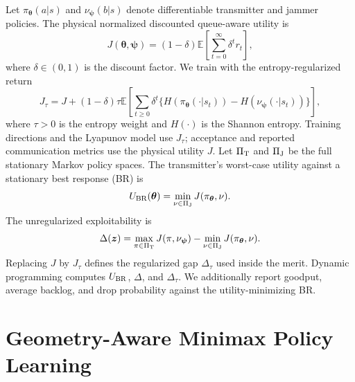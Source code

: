\documentclass[conference]{IEEEtran}
\newcommand{\bz}{\bm{z}}
\newcommand{\btheta}{\bm{\theta}}
\newcommand{\bpsi}{\bm{\psi}}
\newcommand{\E}{\mathbb{E}}
\begin{document}
Let $\pi_{\btheta}(a|s)$ and $\nu_{\bpsi}(b|s)$ denote differentiable transmitter and jammer policies.
The physical normalized discounted queue-aware utility is
\[
J(\btheta,\bpsi)=(1-\delta)\E\!\left[\sum_{t=0}^{\infty}\delta^t r_t\right],
\]
where $\delta\in(0,1)$ is the discount factor.
We train with the entropy-regularized return
\[
J_\tau=J+(1-\delta)\tau\E\!\left[\sum_{t\geq0}\delta^t\{H(\pi_{\btheta}(\cdot|s_t))-H(\nu_{\bpsi}(\cdot|s_t))\}\right],
\]
where $\tau>0$ is the entropy weight and $H(\cdot)$ is the Shannon entropy.
Training directions and the Lyapunov model use $J_\tau$; acceptance and reported communication metrics use the physical utility $J$.
Let $\Pi_{\rm T}$ and $\Pi_{\rm J}$ be the full stationary Markov policy spaces.
The transmitter's worst-case utility against a stationary best response (BR) is
\[
U_{\rm BR}(\btheta)=\min_{\nu\in\Pi_{\rm J}}J(\pi_{\btheta},\nu).
\]
The unregularized exploitability is
\[
\Delta(\bz)=\max_{\pi\in\Pi_{\rm T}}J(\pi,\nu_{\bpsi})-\min_{\nu\in\Pi_{\rm J}}J(\pi_{\btheta},\nu).
\]
Replacing $J$ by $J_\tau$ defines the regularized gap $\Delta_\tau$ used inside the merit.
Dynamic programming computes $U_{\rm BR}$, $\Delta$, and $\Delta_\tau$.
We additionally report goodput, average backlog, and drop probability against the utility-minimizing BR.

\section{Geometry-Aware Minimax Policy Learning}
\end{document}
